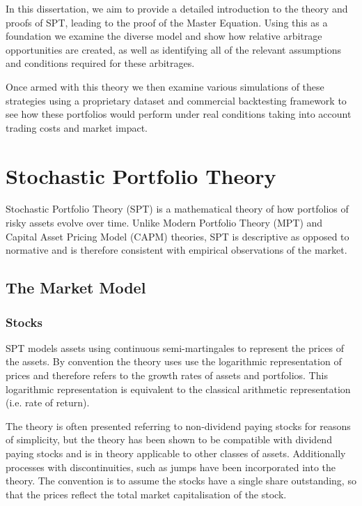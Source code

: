 \documentclass[british]{amsart} \usepackage{lmodern}
\numberwithin{equation}{section} \numberwithin{figure}{section}
\theoremstyle{plain} \newtheorem{thm}{\protect\theoremname}[section]
\theoremstyle{definition} \newtheorem{defn}[thm]{\protect\definitionname}
\theoremstyle{plain} \newtheorem{assumption}[thm]{\protect\assumptionname}
\theoremstyle{plain} \newtheorem{lem}[thm]{\protect\lemmaname}
\theoremstyle{plain} \newtheorem{prop}[thm]{\protect\propositionname}
\theoremstyle{remark} \newtheorem{rem}[thm]{\protect\remarkname}
\theoremstyle{plain} \newtheorem{cor}[thm]{\protect\corollaryname}
\begin{document}
\begin{enumerate}
\end{enumerate}

In this dissertation, we aim to provide a detailed introduction to the theory
and proofs of SPT, leading to the proof of the Master Equation. Using this as a
foundation we examine the diverse model and show how relative arbitrage
opportunities are created, as well as identifying all of the relevant
assumptions and conditions required for these arbitrages.

Once armed with this theory we then examine various simulations of these
strategies using a proprietary dataset and commercial backtesting framework to
see how these portfolios would perform under real conditions taking into account
trading costs and market impact.


\section{Stochastic Portfolio Theory}

Stochastic Portfolio Theory (SPT) is a mathematical theory of how portfolios of
risky assets evolve over time. Unlike Modern Portfolio Theory (MPT) and Capital Asset
Pricing Model (CAPM) theories, SPT is descriptive as opposed to normative and is
therefore consistent with empirical observations of the market.

\subsection{The Market Model}

\subsubsection{Stocks}

SPT models assets using continuous semi-martingales to represent the prices of
the assets. By convention the theory uses use the logarithmic representation of
prices and therefore refers to the growth rates of assets and portfolios. This
logarithmic representation is equivalent to the classical arithmetic
representation (i.e. rate of return).

The theory is often presented referring to non-dividend paying stocks for
reasons of simplicity, but the theory has been shown to be compatible with
dividend paying stocks and is in theory applicable to other classes of assets.
Additionally processes with discontinuities, such as jumps have been
incorporated into the theory. The convention is to assume the stocks have a
single share outstanding, so that the prices reflect the total market
capitalisation of the stock.
\end{document}
